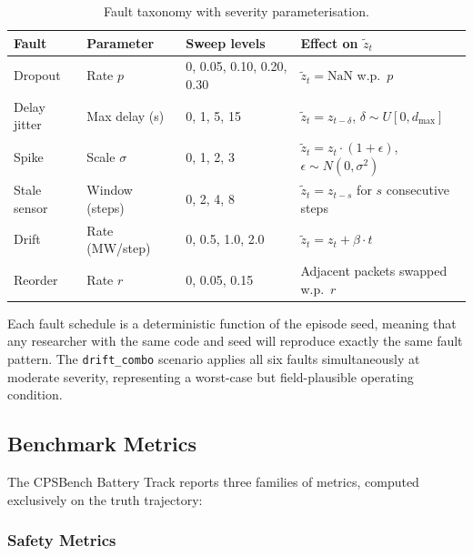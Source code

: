 \begin{table}[ht]
\centering
\caption{Fault taxonomy with severity parameterisation.}
\label{tab:fault-taxonomy-cpsbench}
\begin{tabular}{llll}
\toprule
\textbf{Fault} & \textbf{Parameter} & \textbf{Sweep levels} &
  \textbf{Effect on $\tilde{z}_t$} \\
\midrule
Dropout       & Rate $p$         & 0, 0.05, 0.10, 0.20, 0.30 &
  $\tilde{z}_t = \mathrm{NaN}$ w.p.\ $p$ \\
Delay jitter  & Max delay (s)    & 0, 1, 5, 15 &
  $\tilde{z}_t = z_{t-\delta}$, $\delta \sim U[0, d_{\max}]$ \\
Spike         & Scale $\sigma$   & 0, 1, 2, 3 &
  $\tilde{z}_t = z_t \cdot (1 + \epsilon)$, $\epsilon \sim N(0, \sigma^2)$ \\
Stale sensor  & Window (steps)   & 0, 2, 4, 8 &
  $\tilde{z}_t = z_{t-s}$ for $s$ consecutive steps \\
Drift         & Rate (MW/step)   & 0, 0.5, 1.0, 2.0 &
  $\tilde{z}_t = z_t + \beta \cdot t$ \\
Reorder       & Rate $r$         & 0, 0.05, 0.15 &
  Adjacent packets swapped w.p.\ $r$ \\
\bottomrule
\end{tabular}
\end{table}

Each fault schedule is a deterministic function of the episode seed,
meaning that any researcher with the same code and seed will reproduce
exactly the same fault pattern.  The \texttt{drift\_combo} scenario
applies all six faults simultaneously at moderate severity, representing a
worst-case but field-plausible operating condition.

\subsection{Benchmark Metrics}

The CPSBench Battery Track reports three families of metrics, computed
exclusively on the truth trajectory:

\subsubsection{Safety Metrics}

